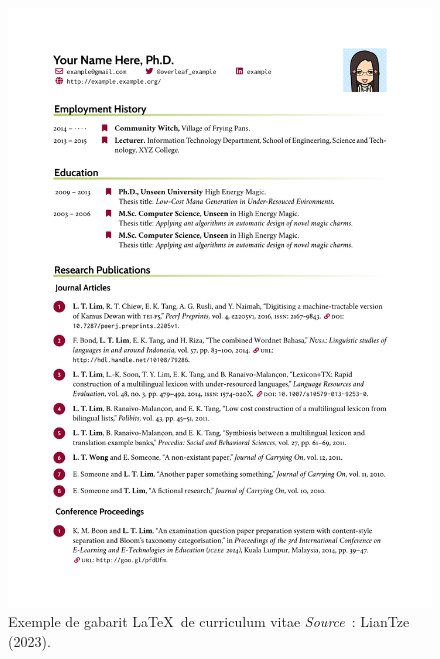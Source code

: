 \documentclass[
  letterpaper,
  DIV=11,
  numbers=noendperiod]{scrreprt}
\begin{document}
\begin{figure}

{\centering \includegraphics[width=6.07in,height=\textheight]{images/chapitre5_CVtemp.png}

}

\caption{\label{fig-cv}Exemple de gabarit \LaTeX~de curriculum vitae
\newline \textit{Source}~: LianTze (2023).}

\end{figure}
\end{document}
